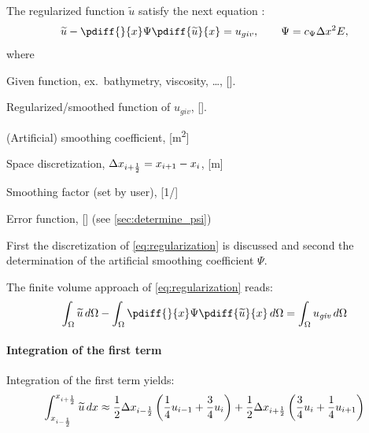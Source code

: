 The regularized function $\widetilde u$ satisfy the next equation \citep[eq.\ 6]{Borsboom1998}:
\begin{align}
    \widetilde u - \pdiff{}{x} \Psi \pdiff{\widetilde u}{x} = u_{giv}, \qquad \Psi = c_{\Psi}\Delta x^2 E, \label{eq:regularization}
\end{align}
where
\begin{symbollist}
    \item[$u_{giv}$] Given function, ex.\ bathymetry, viscosity, \ldots, [\si{\cdot}].
    \item[$\widetilde u$] Regularized/smoothed function of $u_{giv}$, [\si{\cdot}].
    \item[$\Psi$] (Artificial) smoothing coefficient, [\si{\square\metre}]
    \item[$\Dx$] Space discretization, $\Delta x_{i+\frac{1}{2}} = x_{i+1} - x_{i}$, [\si{\metre}]
    \item[$c_{\Psi}$] Smoothing factor (set by user), [\si{1/\cdot}]
    \item[$E$] Error function, [\si{\cdot}] (see \autoref{sec:determine_psi})
\end{symbollist}


First the discretization of \autoref{eq:regularization} is discussed and second the determination of the artificial smoothing coefficient $\Psi$.

The finite volume approach of \autoref{eq:regularization} reads:
\begin{align}
\int_\Omega \widetilde u\, d\Omega  - \int_\Omega \pdiff{}{x}  \Psi \pdiff{\widetilde u}{x}\, d\Omega  = \int_\Omega  u_{\mathit{giv}}\, d\Omega \label{eq:1d_regularization}
\end{align}
\paragraph*{Integration of the first term}
Integration of the first term yields: %
\begin{align}
\int_{x_{i-\frac{1}{2}}}^{x_{i+\frac{1}{2}}} \widetilde u\, dx \approx
\frac{1}{2} \Delta x_{i-\frac{1}{2}} \left( \frac{1}{4} u_{i-1} + \frac{3}{4} u_{i} \right)  +
\frac{1}{2} \Delta x_{i+\frac{1}{2}} \left( \frac{3}{4} u_{i} + \frac{1}{4} u_{i+1} \right)
\end{align}
